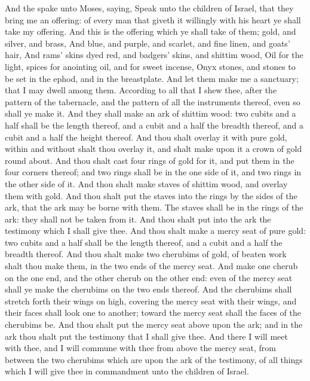 \begin{biblechapter} %
 And the \LORD spake unto Moses, saying,
\verse Speak unto the children of Israel, that they bring me an offering: of every man that giveth it willingly with his heart ye shall take my offering.
\verse And this is the offering which ye shall take of them; gold, and silver, and brass,
\verse And blue, and purple, and scarlet, and fine linen, and goats' hair,
\verse And rams' skins dyed red, and badgers' skins, and shittim wood,
\verse Oil for the light, spices for anointing oil, and for sweet incense,
\verse Onyx stones, and stones to be set in the ephod, and in the breastplate.
\verse And let them make me a sanctuary; that I may dwell among them.
\verse According to all that I shew thee, after the pattern of the tabernacle, and the pattern of all the instruments thereof, even so shall ye make it.
 And they shall make an ark of shittim wood: two cubits and a half shall be the length thereof, and a cubit and a half the breadth thereof, and a cubit and a half the height thereof.
\verse And thou shalt overlay it with pure gold, within and without shalt thou overlay it, and shalt make upon it a crown of gold round about.
\verse And thou shalt cast four rings of gold for it, and put them in the four corners thereof; and two rings shall be in the one side of it, and two rings in the other side of it.
\verse And thou shalt make staves of shittim wood, and overlay them with gold.
\verse And thou shalt put the staves into the rings by the sides of the ark, that the ark may be borne with them.
\verse The staves shall be in the rings of the ark: they shall not be taken from it.
\verse And thou shalt put into the ark the testimony which I shall give thee.
\verse And thou shalt make a mercy seat of pure gold: two cubits and a half shall be the length thereof, and a cubit and a half the breadth thereof.
\verse And thou shalt make two cherubims of gold, of beaten work shalt thou make them, in the two ends of the mercy seat.
\verse And make one cherub on the one end, and the other cherub on the other end: even of the mercy seat shall ye make the cherubims on the two ends thereof.
\verse And the cherubims shall stretch forth their wings on high, covering the mercy seat with their wings, and their faces shall look one to another; toward the mercy seat shall the faces of the cherubims be.
\verse And thou shalt put the mercy seat above upon the ark; and in the ark thou shalt put the testimony that I shall give thee.
\verse And there I will meet with thee, and I will commune with thee from above the mercy seat, from between the two cherubims which are upon the ark of the testimony, of all things which I will give thee in commandment unto the children of Israel.

\end{biblechapter}
